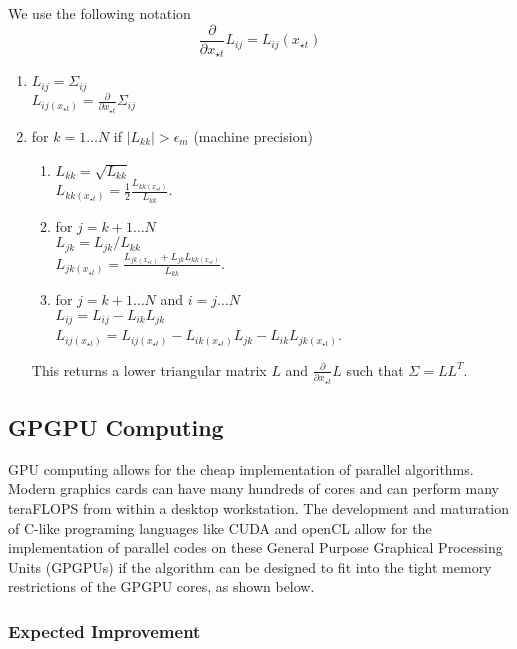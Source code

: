 We use the following notation
\begin{equation}
    \frac{\partial}{\partial x_{\star t}} L_{ij} = L_{ij} (x_{\star t})
\end{equation}
\begin{enumerate}
 \item $L_{ij} = \Sigma_{ij}$ \\
       $L_{ij (x_{\star t})} = \frac{\partial}{\partial x_{\star t}} \Sigma_{ij}$
 \item for $k = 1\ldots N$ if $|L_{kk}| > \epsilon_{m}$ (machine precision)
 \begin{enumerate}
  \item $L_{kk} = \sqrt{L_{kk}}$ \\
	$L_{kk (x_{\star t})} = \frac{1}{2} \frac{L_{kk (x_{\star t})}}{L_{kk}}$.
  \item for $j = k+1\ldots N$ \\
	$L_{jk} = L_{jk}/L_{kk}$ \\
	$L_{jk (x_{\star t})} = \frac{L_{jk (x_{\star t})} + L_{jk}L_{kk (x_{\star t})}}{L_{kk}}$.
  \item for $j = k+1\ldots N$ and $i = j\ldots N$ \\
	$L_{ij} = L_{ij} - L_{ik}L_{jk}$ \\
	$L_{ij (x_{\star t})} = L_{ij (x_{\star t})} - L_{ik (x_{\star t})}L_{jk} - L_{ik}L_{jk (x_{\star t})}$.
 \end{enumerate}

This returns a lower triangular matrix $L$ and $\frac{\partial}{\partial x_{\star t}} L$ such that $\Sigma = LL^{T}$.

\end{enumerate}

\subsection{GPGPU Computing} %
\label{sec:GPGPU Computing}

GPU computing allows for the cheap implementation of parallel algorithms. Modern graphics cards can have many hundreds of cores and can perform many teraFLOPS from within a desktop workstation. The development and maturation of C-like programing languages like CUDA and openCL allow for the implementation of parallel codes on these General Purpose Graphical Processing Units (GPGPUs) if the algorithm can be designed to fit into the tight memory restrictions of the GPGPU cores, as shown below.

\subsubsection{Expected Improvement}
\label{GPUEI}


